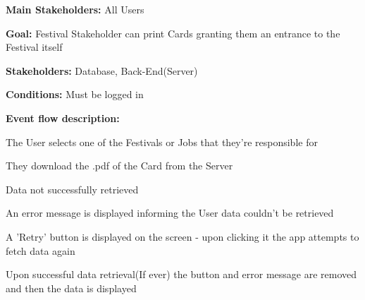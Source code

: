 			\noindent {}
			\begin{packed_item}
				\item \textbf{Main Stakeholders:} All Users
				\item \textbf{Goal:} Festival Stakeholder can print Cards granting them an entrance to the Festival itself
				\item \textbf{Stakeholders: } Database, Back-End(Server)
				\item \textbf{Conditions: } Must be logged in
				\item \textbf{Event flow description: }
				\begin{packed_enum}
					\item The User selects one of the Festivals or Jobs that they're responsible for
					\item They download the .pdf of the Card from the Server
				\end{packed_enum}
				
				\begin{packed_item}
					\item[2.a] Data not successfully retrieved
					\item[] \begin{packed_enum}
						\item An error message is displayed informing the User data couldn't be retrieved
						\item A 'Retry' button is displayed on the screen - upon clicking it the app attempts to fetch data again
						\item Upon successful data retrieval(If ever) the button and error message are removed and then the data is displayed
					\end{packed_enum}
				\end{packed_item}
			\end{packed_item}
		
